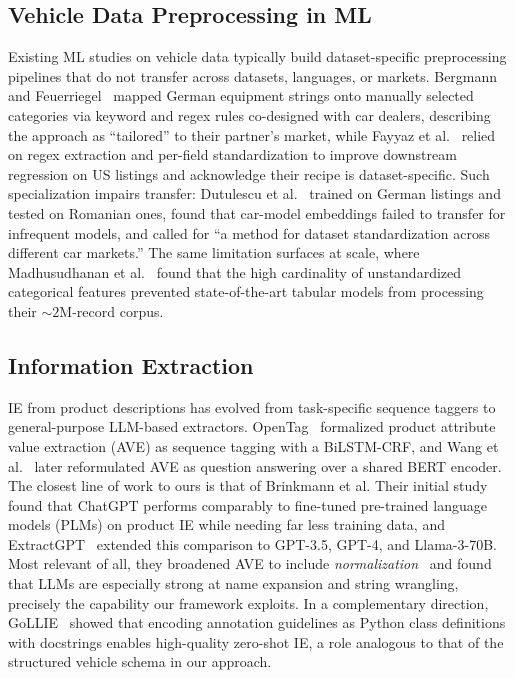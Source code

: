 \documentclass[conference]{IEEEtran}
\begin{document}
\subsection{Vehicle Data Preprocessing in ML}

Existing ML studies on vehicle data typically build dataset-specific preprocessing pipelines that do not transfer across datasets, languages, or markets. Bergmann and Feuerriegel~\cite{bergmann2025125640} mapped German equipment strings onto manually selected categories via keyword and regex rules co-designed with car dealers, describing the approach as ``tailored'' to their partner's market, while Fayyaz et al.~\cite{vehicles7030094} relied on regex extraction and per-field standardization to improve downstream regression on US listings and acknowledge their recipe is dataset-specific. Such specialization impairs transfer: Dutulescu et al.~\cite{electronics12143083} trained on German listings and tested on Romanian ones, found that car-model embeddings failed to transfer for infrequent models, and called for ``a method for dataset standardization across different car markets.'' The same limitation surfaces at scale, where Madhusudhanan et al.~\cite{10825740} found that the high cardinality of unstandardized categorical features prevented state-of-the-art tabular models from processing their $\sim$$2$M-record corpus.

\subsection{Information Extraction}

IE from product descriptions has evolved from task-specific sequence taggers to general-purpose LLM-based extractors. OpenTag~\cite{zheng2018opentag} formalized product attribute value extraction (AVE) as sequence tagging with a BiLSTM-CRF, and Wang et al.~\cite{wang2020aveqa} later reformulated AVE as question answering over a shared BERT encoder. The closest line of work to ours is that of Brinkmann et al. Their initial study~\cite{brinkmann2023chatgpt_ie} found that ChatGPT performs comparably to fine-tuned pre-trained language models (PLMs) on product IE while needing far less training data, and ExtractGPT~\cite{brinkmann2024extractgpt} extended this comparison to GPT-3.5, GPT-4, and Llama-3-70B. Most relevant of all, they broadened AVE to include \textit{normalization}~\cite{brinkmann2024adbis} and found that LLMs are especially strong at name expansion and string wrangling, precisely the capability our framework exploits. In a complementary direction, GoLLIE~\cite{sainz2024gollie} showed that encoding annotation guidelines as Python class definitions with docstrings enables high-quality zero-shot IE, a role analogous to that of the structured vehicle schema in our approach.
\end{document}
